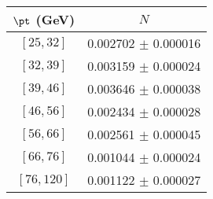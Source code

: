 \begin{tabular}{c||c}
$\pt$ (GeV) & $N$  \\
\hline
$[25, 32]$ & 0.002702 $\pm$ 0.000016\\
$[32, 39]$ & 0.003159 $\pm$ 0.000024\\
$[39, 46]$ & 0.003646 $\pm$ 0.000038\\
$[46, 56]$ & 0.002434 $\pm$ 0.000028\\
$[56, 66]$ & 0.002561 $\pm$ 0.000045\\
$[66, 76]$ & 0.001044 $\pm$ 0.000024\\
$[76, 120]$ & 0.001122 $\pm$ 0.000027\\
\end{tabular}
